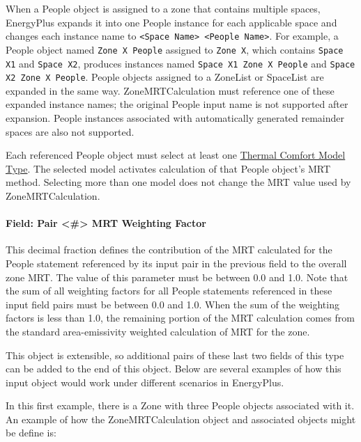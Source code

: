 When a People object is assigned to a zone that contains multiple spaces, EnergyPlus expands it into one People instance for each applicable space and changes each instance name to \texttt{<Space Name> <People Name>}. For example, a People object named \texttt{Zone X People} assigned to \texttt{Zone X}, which contains \texttt{Space X1} and \texttt{Space X2}, produces instances named \texttt{Space X1 Zone X People} and \texttt{Space X2 Zone X People}. People objects assigned to a ZoneList or SpaceList are expanded in the same way. ZoneMRTCalculation must reference one of these expanded instance names; the original People input name is not supported after expansion. People instances associated with automatically generated remainder spaces are also not supported.

Each referenced People object must select at least one \hyperref[field-thermal-comfort-model-type-up-to-7-allowed]{Thermal Comfort Model Type}. The selected model activates calculation of that People object's MRT method. Selecting more than one model does not change the MRT value used by ZoneMRTCalculation.

\paragraph{Field: Pair \textless{}\#\textgreater{} MRT Weighting Factor}\label{field-zonemrtcalculation-weightingfactorX}

This decimal fraction defines the contribution of the MRT calculated for the People statement referenced by its input pair in the previous field to the overall zone MRT.  The value of this parameter must be between 0.0 and 1.0.  Note that the sum of all weighting factors for all People statements referenced in these input field pairs must be between 0.0 and 1.0.  When the sum of the weighting factors is less than 1.0, the remaining portion of the MRT calculation comes from the standard area-emissivity weighted calculation of MRT for the zone.

This object is extensible, so additional pairs of these last two fields of this type can be added to the end of this object.  Below are several examples of how this input object would work under different scenarios in EnergyPlus.

In this first example, there is a Zone with three People objects associated with it. An example of how the ZoneMRTCalculation object and associated objects might be define is:

